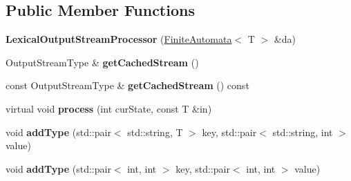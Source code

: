 \subsection*{Public Member Functions}
\begin{DoxyCompactItemize}
\item 
\mbox{\label{classx2_1_1_lexical_output_stream_processor_a3c6459aa48678f1f021c2173949b1da8}} 
{\bfseries Lexical\+Output\+Stream\+Processor} (\hyperlink{classx2_1_1_finite_automata}{Finite\+Automata}$<$ T $>$ \&da)
\item 
\mbox{\label{classx2_1_1_lexical_output_stream_processor_a776187b870429aec3d29639cfec125cb}} 
Output\+Stream\+Type \& {\bfseries get\+Cached\+Stream} ()
\item 
\mbox{\label{classx2_1_1_lexical_output_stream_processor_a604f90577a9a2edb5a46d48e23bdbe3f}} 
const Output\+Stream\+Type \& {\bfseries get\+Cached\+Stream} () const
\item 
\mbox{\label{classx2_1_1_lexical_output_stream_processor_af48a62609df67717be94c7d9bb979807}} 
virtual void {\bfseries process} (int cur\+State, const T \&in)
\item 
\mbox{\label{classx2_1_1_lexical_output_stream_processor_a4733c0d4578dbce6e87804fbe7db327e}} 
void {\bfseries add\+Type} (std\+::pair$<$ std\+::string, T $>$ key, std\+::pair$<$ std\+::string, int $>$ value)
\item 
\mbox{\label{classx2_1_1_lexical_output_stream_processor_a7e25ccd87f2694194cb28545194ccd1c}} 
void {\bfseries add\+Type} (std\+::pair$<$ int, int $>$ key, std\+::pair$<$ int, int $>$ value)
\end{DoxyCompactItemize}
